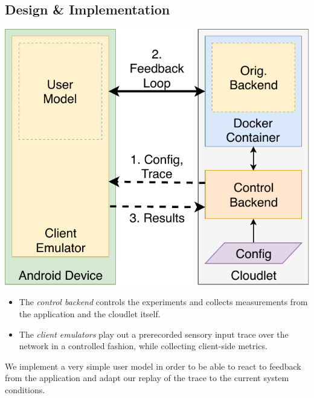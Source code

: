 \documentclass[portrait, a1]{KTHEEposter}
\begin{document}
\begin{pcolumns}[3]
\begin{pcolumn}[3]
\begin{pframe}[1.2]
                \section{Design \& Implementation}
                \begin{center}
                    \medskip
                    \includegraphics[width=.85\linewidth]{img/TraceReplay_GenArch}
                    \medskip
                \end{center}
                \begin{itemize}
                    \item The \emph{control backend} controls the experiments and collects measurements from the application and the cloudlet itself.
                    \item The \emph{client emulators} play out a prerecorded sensory input trace over the network in a controlled fashion, while collecting client-side metrics.
                \end{itemize}
            \end{pframe}%
            \begin{pframe}[1.13]
                \smallskip
                \begin{center}
                    \medskip
                    
                    \medskip
                \end{center}
                We implement a very simple user model in order to be able to react to feedback from the application and adapt our replay of the trace to the current system conditions.
            \end{pframe}%
            \begin{pframe}[.67]

\end{pframe}
\end{pcolumn}
\end{pcolumns}
\end{document}
